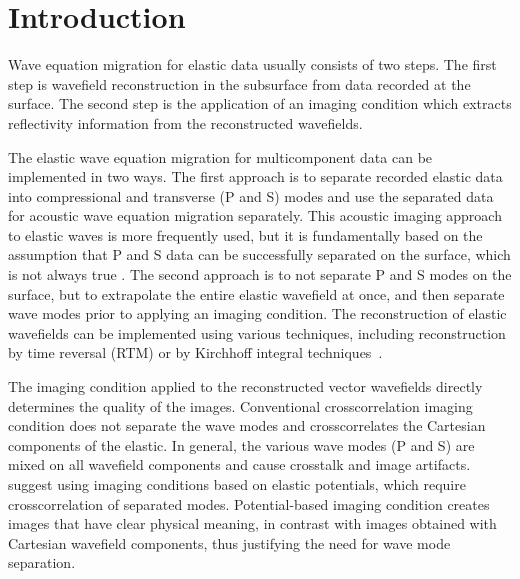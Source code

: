 \section{Introduction}
Wave equation migration for elastic data usually consists of two
steps. The first step is wavefield reconstruction in the subsurface
from data recorded at the surface. The second step is {the
application of} an imaging condition which extracts reflectivity
information from the reconstructed wavefields.

The elastic wave equation migration for multicomponent data can be
implemented in two ways. The first approach is to separate recorded
elastic data into compressional and transverse (P and S) modes and
use the separated data for acoustic wave equation migration
separately. This acoustic imaging approach to elastic waves is more
frequently used, but it is fundamentally based on the assumption that
P and S data can be successfully separated on the surface, which is
not always true
\cite[]{etgen:972,GEO62-02-05980613}.
The second approach is to not separate P and S modes on the surface,
but to extrapolate the entire elastic wavefield at once, and then
separate wave modes prior to applying an imaging condition. The
reconstruction of elastic wavefields can be implemented using various
techniques, including reconstruction by time reversal (RTM)
\cite[]{chang:67,chang:597} or by Kirchhoff integral 
techniques~\cite[]{hokstad:861}.

The imaging condition applied to the reconstructed vector wavefields
directly determines the quality of the images. Conventional
crosscorrelation imaging condition does not separate the wave modes
and crosscorrelates the Cartesian components of the
elastic.  In general, the various wave
modes (P and S) are mixed on all wavefield components and cause
crosstalk and image artifacts.
\cite{yan:WB19} suggest using imaging conditions based on elastic 
potentials, which require crosscorrelation of separated modes.
Potential-based imaging condition creates images that have clear
physical meaning, in contrast with images obtained with Cartesian
wavefield components, thus justifying the need for wave mode
separation.

